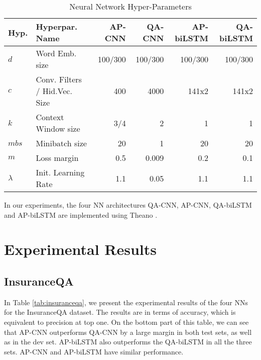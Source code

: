 \documentclass{article}
\begin{document}
\begin{table*}[ht!]
\caption{Neural Network Hyper-Parameters}
\label{tab:nn_hyperparams}
\vskip 0.15in
\begin{center}
\begin{small}
\begin{sc}
\begin{tabular}{llrrrr}
\hline
\abovespace\belowspace
\bf Hyp. & \bf Hyperpar. Name  & \bf AP-CNN & \bf QA-CNN & \bf AP-biLSTM & \bf QA-biLSTM \\
\hline
$d$          & Word Emb. size        & 100/300 & 100/300 & 100/300 & 100/300 \\
$c$          & Conv. Filters / Hid.Vec. Size         & 400     & 4000    & 141x2 & 141x2 \\ 
$k$          & Context Window size   & 3/4     & 2       & 1 & 1 \\ 
$mbs$        & Minibatch size        & 20      & 1       & 20 & 20 \\
$m$          & Loss margin           & 0.5     & 0.009   & 0.2 & 0.1 \\
$\lambda$    & Init. Learning Rate & 1.1       & 0.05    & 1.1 & 1.1 \\
\hline
\end{tabular}
\end{sc}
\end{small}
\end{center}
\vskip -0.1in
\end{table*}

In our experiments, 
the four NN architectures QA-CNN, 
AP-CNN, 
QA-biLSTM 
and AP-biLSTM are implemented using Theano \cite{bergstra:scipy2010}.
 \section{Experimental Results}
\label{experimental_results}

\subsection{InsuranceQA}
In Table \ref{tab:insuranceqa},
we present the experimental results of the four NNs for the InsuranceQA dataset.
The results are in terms of accuracy,
which is equivalent to precision at top one.
On the bottom part of this table,
we can see that AP-CNN outperforms QA-CNN by a large margin in both test sets,
as well as in the dev set.
AP-biLSTM also outperforms the QA-biLSTM in all the three sets.
AP-CNN and AP-biLSTM have similar performance.
\end{document}
